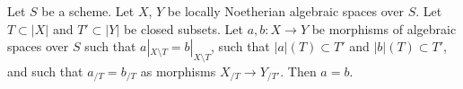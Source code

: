 \begin{lemma}
\label{lemma-faithful}
Let $S$ be a scheme. Let $X$, $Y$ be locally Noetherian algebraic spaces
over $S$. Let $T \subset |X|$ and $T' \subset |Y|$ be closed subsets.
Let $a, b : X \to Y$ be morphisms of algebraic spaces over $S$ such
that $a|_{X \setminus T} = b|_{X \setminus T}$, such that
$|a|(T) \subset T'$ and $|b|(T) \subset T'$, and such that
$a_{/T} = b_{/T}$ as morphisms $X_{/T} \to Y_{/T'}$.
Then $a = b$.
\end{lemma}